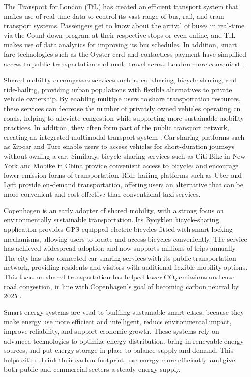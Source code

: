 \documentclass[pdflatex,sn-mathphys-num]{sn-jnl}%
\theoremstyle{thmstyleone}%
\theoremstyle{thmstyletwo}%
\theoremstyle{thmstylethree}%
\begin{document}
The Transport for London (TfL) has created an efficient transport system that makes use of real-time data to control its vast range of bus, rail, and tram transport systems. Passengers get to know about the arrival of buses in real-time via the Count down program at their respective stops or even online, and TfL makes use of data analytics for improving its bus schedules. In addition, smart fare technologies such as the Oyster card and contactless payment have simplified access to public transportation and made travel across London more convenient \cite{r77,r104}.

Shared mobility encompasses services such as car-sharing, bicycle-sharing, and ride-hailing, providing urban populations with flexible alternatives to private vehicle ownership. By enabling multiple users to share transportation resources, these services can decrease the number of privately owned vehicles operating on roads, helping to alleviate congestion while supporting more sustainable mobility practices. In addition, they often form part of the public transport network, creating an integrated multimodal transport system \cite{r11}. Car-sharing platforms such as Zipcar and Turo enable users to access vehicles for short-duration journeys without owning a car. Similarly, bicycle-sharing services such as Citi Bike in New York and Mobike in China provide convenient access to bicycles and encourage lower-emission forms of transportation. Ride-hailing platforms such as Uber and Lyft provide on-demand transportation, offering users an alternative that can be more convenient and cost-effective than conventional taxi services.

Copenhagen is an early adopter of shared mobility, with a strong focus on environmentally sustainable transportation. Its Bycyklen bicycle-sharing application provides GPS-equipped electric bicycles fitted with smart locking mechanisms, allowing users to locate and access bicycles conveniently. The service has achieved widespread adoption and now supports millions of trips annually. The city has also connected car-sharing services with its public transportation network, providing residents and visitors with additional flexible mobility options. This focus on shared transportation has helped lower CO$_2$ emissions and ease road congestion, in line with Copenhagen's goal of becoming carbon neutral by 2025 \cite{r78,r105}.

Smart energy systems are vital to building sustainable smart cities, because they make energy use more efficient and intelligent, reduce environmental impact, improve reliability, and support economic growth. These systems rely on advanced technologies to optimize energy distribution, bring in renewable energy sources, and put energy storage in place to balance supply and demand. This helps cities shrink their carbon footprint, use energy more efficiently, and give both public and commercial sectors a steady energy supply.
\end{document}
